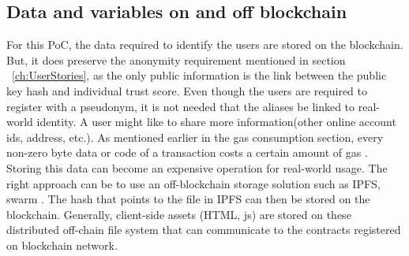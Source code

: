 \subsection{Data and variables on and off blockchain}
For this PoC, the data required to identify the users are stored on the
blockchain. But, it does preserve the anonymity requirement mentioned in
section ~\ref{ch:UserStories}, as the only public information is the link
between the public key hash and individual trust score. Even though the users
are required to register with a pseudonym, it is not needed that the aliases be
linked to real-world identity. A user might like to share more
information(other online account ids, address, etc.).  As mentioned earlier in
the gas consumption section, every non-zero byte data or code of a transaction
costs a certain amount of gas \cite{buterin2013ethereum}. Storing this data can
become an expensive operation for real-world usage. The right approach can be
to use an off-blockchain storage solution such as IPFS, swarm
\cite{benet2014ipfs}. The hash that points to the file in IPFS can then be
stored on the blockchain.  Generally, client-side assets (HTML, js) are stored
on these distributed off-chain file system that can communicate to the
contracts registered on blockchain network. 

